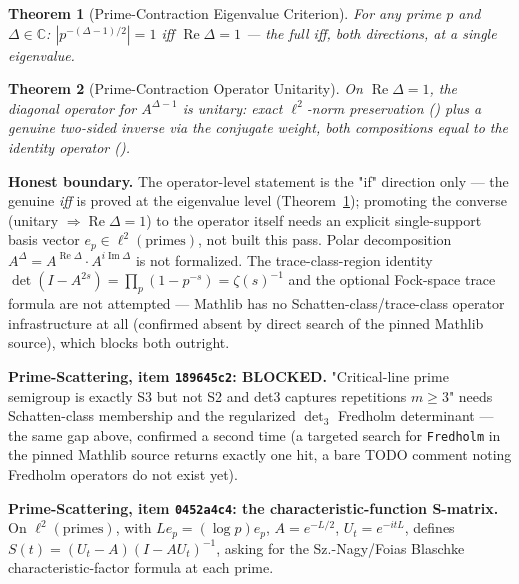 \documentclass{report}
\newtheorem{theorem}{Theorem}[chapter]
\theoremstyle{definition}
\begin{document}
\begin{theorem}[Prime-Contraction Eigenvalue Criterion]
  \label{thm:prime-contraction-eigenvalue}
  \leanok
  For any prime $p$ and $\Delta\in\mathbb{C}$: $|p^{-(\Delta-1)/2}|=1$ iff
  $\operatorname{Re}\Delta=1$ --- the full \emph{iff}, both directions, at a single
  eigenvalue.
\end{theorem}

\begin{theorem}[Prime-Contraction Operator Unitarity]
  \label{thm:prime-contraction-unitary}
  \leanok
  On $\operatorname{Re}\Delta=1$, the diagonal operator for $A^{\Delta-1}$ is unitary:
  exact $\ell^2$-norm preservation
  () plus a genuine two-sided inverse via the
  conjugate weight, both compositions equal to the identity operator
  ().
\end{theorem}

\textbf{Honest boundary.} The operator-level statement is the "if" direction only --- the
genuine \emph{iff} is proved at the eigenvalue level (Theorem~\ref{thm:prime-contraction-eigenvalue});
promoting the converse (unitary $\Rightarrow\operatorname{Re}\Delta=1$) to the operator
itself needs an explicit single-support basis vector $e_p\in\ell^2(\text{primes})$, not
built this pass. Polar decomposition $A^\Delta=A^{\operatorname{Re}\Delta}\cdot
A^{i\operatorname{Im}\Delta}$ is not formalized. The trace-class-region identity
$\det(I-A^{2s})=\prod_p(1-p^{-s})=\zeta(s)^{-1}$ and the optional Fock-space trace formula
are not attempted --- Mathlib has no Schatten-class/trace-class operator infrastructure
at all (confirmed absent by direct search of the pinned Mathlib source), which blocks
both outright.

\textbf{Prime-Scattering, item \texttt{189645c2}: BLOCKED.} "Critical-line prime
semigroup is exactly S3 but not S2 and det3 captures repetitions $m\ge3$" needs
Schatten-class membership and the regularized $\det_3$ Fredholm determinant --- the same
gap above, confirmed a second time (a targeted search for \texttt{Fredholm} in the pinned
Mathlib source returns exactly one hit, a bare TODO comment noting Fredholm operators do
not exist yet).

\textbf{Prime-Scattering, item \texttt{0452a4c4}: the characteristic-function S-matrix.}
On $\ell^2(\text{primes})$, with $Le_p=(\log p)e_p$, $A=e^{-L/2}$, $U_t=e^{-itL}$, defines
$S(t)=(U_t-A)(I-AU_t)^{-1}$, asking for the Sz.-Nagy/Foias Blaschke characteristic-factor
formula at each prime.
\end{document}
